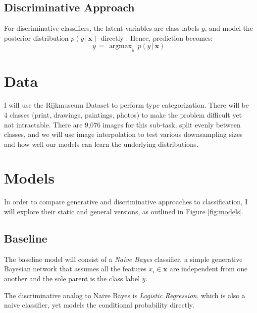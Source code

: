\documentclass{article}
\DeclareMathOperator*{\argmax}{argmax}
\begin{document}
\subsection{Discriminative Approach}
For discriminative classifiers, the latent variables are class
labels $y$, and model the posterior distribution $p(y\,|\,\mathbf{x})$
directly \cite{NgJordan}. Hence, prediction becomes:
\begin{equation}
  \hat{y} \,=\, \argmax_y \, p(y \,|\, \mathbf{x})
\end{equation}

\section{Data}
I will use the Rijkmuseum Dataset \cite{Rijksmuseum} to perform type categorization.
There will be 4 classes (print, drawings, paintings, photos) to make the problem difficult
yet not intractable. There are 9,076 images for this sub-task, split evenly between classes,
and we will use image interpolation to test various downsampling sizes and how well
our models can learn the underlying distributions.


\section{Models}
In order to compare generative and discriminative
approaches to classification, I will explore their static and general versions,
as outlined in Figure \ref{fig:models}.

\subsection{Baseline}
The baseline model will consist of a \textit{Naive Bayes} classifier, a simple generative
Bayesian network that assumes all the features $x_i \in \mathbf{x}$ are
independent from one another and the sole parent is the class label $y$.

The discriminative analog to Naive Bayes is \textit{Logistic Regression}, which is
also a naive classifier, yet models the conditional probability directly.
\end{document}
